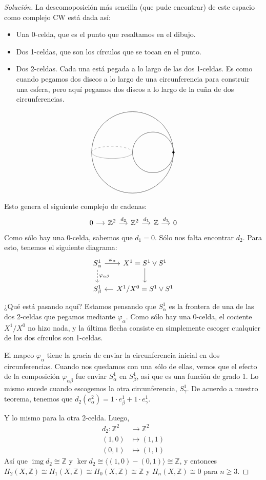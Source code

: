 \documentclass[spanish]{book}
\theoremstyle{definition}
\newcommand{\Z}{\mathbb{Z}}
\DeclareMathOperator{\img}{img}
\begin{document}
	\begin{proof}[Solución]
	La descomoposición más sencilla (que pude encontrar) de este espacio como complejo CW está dada así:
		\begin{itemize}
		\item Una 0-celda, que es el punto que resaltamos en el dibujo.
		\item Dos 1-celdas, que son los círculos que se tocan en el punto.
		\item Dos 2-celdas. Cada una está pegada a lo largo de las dos 1-celdas. Es como cuando pegamos dos discos a lo largo de una circunferencia para construir una esfera, pero aquí pegamos dos discos a lo largo de la cuña de dos circunferencias.
	\end{itemize}
	\[\begin{tikzpicture}
		\draw (0,0) circle (2);
		
		\draw (1,0) circle (1);
		
		\draw[gray] (-2,0) arc (180:360:1 and 0.3);
		\draw[gray,dashed] (-2,0) arc (180:0:1 and 0.3);
		
		\filldraw (2,0) circle (0.05);
	\end{tikzpicture}\]
	Esto genera el siguiente complejo de cadenas:
	\[\begin{tikzcd}[column sep=small]
		0\arrow[r]&\Z^2\arrow[r,"d_2"]&\Z^2\arrow[r,"d_1"]&\Z\arrow[r,"d_1"]&0
	\end{tikzcd}\]
	Como sólo hay una 0-celda, sabemos que $d_1=0$. Sólo nos falta encontrar $d_2$. Para esto, tenemos el siguiente diagrama:
	\[\begin{tikzcd}[column sep=small]
		S^1_\alpha\arrow[r,"\varphi_\alpha"]\arrow[d,dashed,"\varphi_{\alpha\beta}"]&X^1=S^1\vee S^1\arrow[d]\\
		S^1_\beta&X^1/X^0=S^1\vee S^1\arrow[l]
	\end{tikzcd}\]
	¿Qué está pasando aquí? Estamos pensando que $S^1_\alpha$ es la frontera de una de las dos 2-celdas que pegamos mediante $\varphi_\alpha$. Como sólo hay una 0-celda, el cociente $X^1/X^0$ no hizo nada, y la última flecha consiste en simplemente escoger cualquier de los dos círculos son 1-celdas.
	
	El mapeo $\varphi_\alpha$ tiene la gracia de enviar la circunferencia inicial en dos circunferencias. Cuando nos quedamos con una sólo de ellas, vemos que el efecto de la composición $\varphi_{\alpha\beta}$ fue enviar $S^1_\alpha$ en $S^1_\beta$, así que es una función de grado 1. Lo mismo sucede cuando escogemos la otra circunferencia, $S^1_\gamma$. De acuerdo a nuestro teorema, tenemos que $d_2(e^2_\alpha)=1\cdot e^1_\beta+1\cdot e^1_\gamma$.
	
	Y lo mismo para la otra 2-celda. Luego,
	\begin{align*}
		d_2:\Z^2&\to\Z^2\\
		(1,0)&\mapsto (1,1)\\
		(0,1)&\mapsto (1,1)
	\end{align*}
	Así que $\img d_2\cong\Z$ y $\ker d_2\cong\langle (1,0)-(0,1)\rangle\cong\Z$, y entonces $H_2(X,\Z)\cong H_1(X,\Z)\cong H_0(X,\Z)\cong\Z$ y $H_n(X,\Z)\cong0$ para $n\geq3$.
\end{proof}
\end{document}
